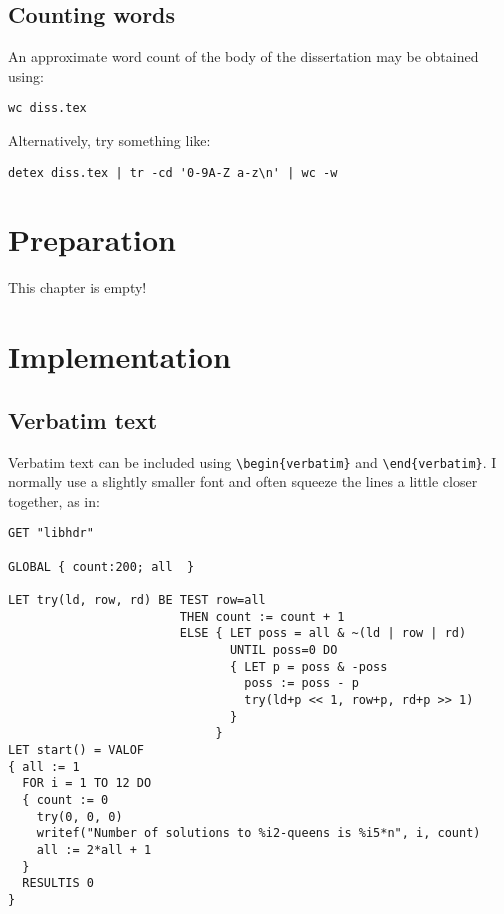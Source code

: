 \documentclass[12pt,twoside,notitlepage]{report}
\renewcommand{\baselinestretch}{1.1}    %
\begin{document}
\section{Counting words}

An approximate word count of the body of the dissertation may be
obtained using:

{\tt wc diss.tex}

\noindent
Alternatively, try something like:

\verb/detex diss.tex | tr -cd '0-9A-Z a-z\n' | wc -w/




\cleardoublepage



\chapter{Preparation}

This chapter is empty!


\cleardoublepage
\chapter{Implementation}

\section{Verbatim text}

Verbatim text can be included using \verb|\begin{verbatim}| and
\verb|\end{verbatim}|. I normally use a slightly smaller font and
often squeeze the lines a little closer together, as in:

{\renewcommand{\baselinestretch}{0.8}\small\begin{verbatim}
GET "libhdr"

GLOBAL { count:200; all  }

LET try(ld, row, rd) BE TEST row=all
                        THEN count := count + 1
                        ELSE { LET poss = all & ~(ld | row | rd)
                               UNTIL poss=0 DO
                               { LET p = poss & -poss
                                 poss := poss - p
                                 try(ld+p << 1, row+p, rd+p >> 1)
                               }
                             }
LET start() = VALOF
{ all := 1
  FOR i = 1 TO 12 DO
  { count := 0
    try(0, 0, 0)
    writef("Number of solutions to %i2-queens is %i5*n", i, count)
    all := 2*all + 1
  }
  RESULTIS 0
}
\end{verbatim}
}
\end{document}

